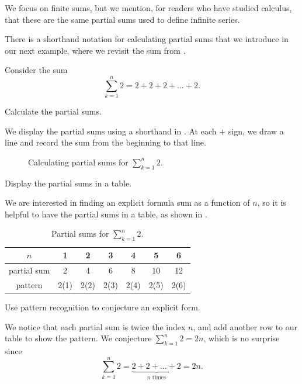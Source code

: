 We focus on finite sums, but we mention, for readers who have studied calculus, that these are the same partial sums used to define infinite series. 

There is a shorthand notation for calculating partial sums that we introduce in our next example, where we revisit the sum from .

\begin{exam}
\label{exam_partial_sums_conj_constant}
    Consider the sum $$\sum_{k=1}^n 2 =2 + 2 + 2 + \ldots + 2.$$  
        \begin{apart}
            \item Calculate the partial sums.
                \begin{soln}
                    We display the partial sums using a shorthand in .  At each $+$ sign, we draw a line and record the sum from the beginning to that line.
                \end{soln}
                \begin{figure}[hbtp]
                    \centering
                    \scalebox{0.75}{}
                    \caption{Calculating partial sums for $\displaystyle \sum_{k=1}^n2$.}
                    \label{fig_part_sums_constant}
                \end{figure}
            \item Display the partial sums in a table.
                \begin{soln}
                    We are interested in finding an explicit formula sum as a function of $n$, so it is helpful to have the partial sums in a table, as shown in .
                \end{soln}
                \begin{table}[hbtp]
                    \centering
                    \begin{tabular}{c|c|c|c|c|c|c}
                        $n$ & 1 & 2 & 3 & 4 & 5 & 6 \\ \hline
                        partial sum & 2 & 4 & 6 & 8 & 10 & 12 \\ \hline
                        pattern & 2(1) & 2(2) & 2(3) & 2(4) & 2(5) & 2(6)
                    \end{tabular}
                    \caption{Partial sums for $\displaystyle \sum_{k=1}^n2$.}
                    \label{tab_partial_sums_constant}
                \end{table}
            \item Use pattern recognition to conjecture an explicit form.
                \begin{soln}
                    We notice that each partial sum is twice the index $n$, and add another row to our table to show the pattern.  We conjecture $\displaystyle \sum_{k=1}^n2=2n$, which is no surprise since
                    $$ \sum_{k=1}^n2 = \underbrace{2 +2+ \ldots + 2}_{n \text{ times}}=2n.$$
                \end{soln}
        \end{apart}
\end{exam}

